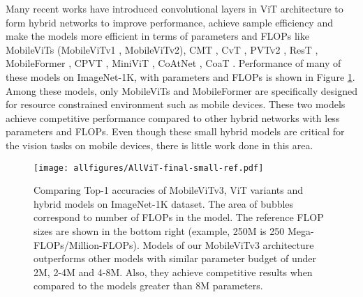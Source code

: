 \documentclass{article} \usepackage{iclr2022_conference,times}
\begin{document}
Many recent works have introduced convolutional layers in ViT architecture to form hybrid networks to improve performance, achieve sample efficiency and make the models more efficient in terms of parameters and FLOPs like MobileViTs (MobileViTv1 \citep{mehta2021mobilevit}, MobileViTv2\citep{mehta2022mobilevit}), CMT \citep{guo2022cmt}, CvT \citep{wu2021cvt}, PVTv2 \citep{wang2022pvt}, ResT \citep{zhang2021rest}, MobileFormer \citep{chen2022mobile}, CPVT \citep{chu2021conditional}, MiniViT \citep{zhang2022minivit}, CoAtNet \citep{dai2021coatnet}, CoaT \citep{xu2021co}. 
Performance of many of these models on ImageNet-1K, with parameters and FLOPs is shown in Figure  \ref{fig:ViT_comp}.
Among these models, only MobileViTs and MobileFormer are specifically designed for resource constrained environment such as mobile devices.
These two models achieve competitive performance compared to other hybrid networks with less parameters and FLOPs.
Even though these small hybrid models are critical for the vision tasks on mobile devices, there is little work done in this area.

\begin{figure}[t]
    \begin{center}
    \texttt{[image: allfigures/AllViT-final-small-ref.pdf]}
    \end{center}
    \caption{Comparing Top-1 accuracies of MobileViTv3, ViT variants and hybrid models on ImageNet-1K dataset. The area of bubbles correspond to number of FLOPs in the model. The reference FLOP sizes are shown in the bottom right (example, 250M is 250 Mega-FLOPs/Million-FLOPs). Models of our MobileViTv3 architecture outperforms other models with similar parameter budget of under 2M, 2-4M and 4-8M. Also, they achieve competitive results when compared to the models greater than 8M parameters.}
    \label{fig:ViT_comp}
\end{figure}
\end{document}
